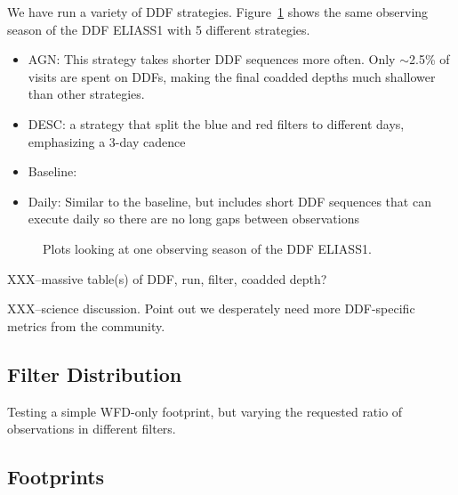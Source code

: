 We have run a variety of DDF strategies. Figure~\ref{fig:ddfexamples} shows the same observing season of the DDF ELIASS1 with 5 different strategies. 

\begin{itemize}
    \item{AGN: This strategy takes shorter DDF sequences more often. Only $\sim$2.5\% of visits are spent on DDFs, making the final coadded depths much shallower than other strategies.}
    \item{DESC: a strategy that split the blue and red filters to different days, emphasizing a 3-day cadence}
    \item{Baseline:  }
    \item{Daily: Similar to the baseline, but includes short DDF sequences that can execute daily so there are no long gaps between observations}
\end{itemize}


\begin{figure}
\caption{Plots looking at one observing season of the DDF ELIASS1. }\label{fig:ddfexamples}
\end{figure}

XXX--massive table(s) of DDF, run, filter, coadded depth?

XXX--science discussion.  Point out we desperately need more DDF-specific metrics from the community. 


\subsection{Filter Distribution}

Testing a simple WFD-only footprint, but varying the requested ratio of observations in different filters.


\subsection{Footprints}

